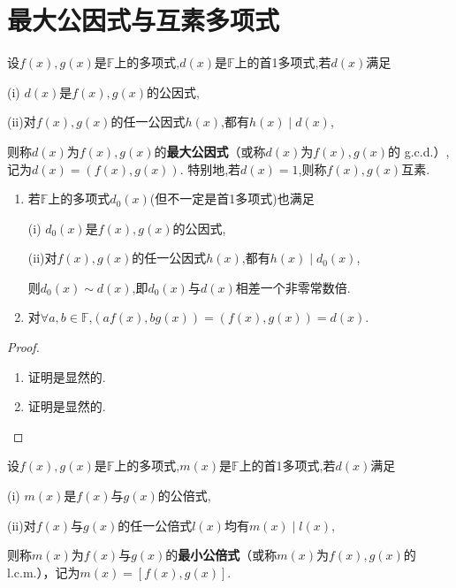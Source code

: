 \documentclass[../../main.tex]{subfiles}%
\begin{document}
\section{最大公因式与互素多项式}

\begin{definition}[最大公因式和互素]\label{definition:最大公因式和互素}
设\(f(x),g(x)\)是\(\mathbb{F}\)上的多项式,$d(x)$是\(\mathbb{F}\)上的首1多项式,若\(d(x)\)满足

(i)$\,\,d(x)$是\(f(x),g(x)\)的公因式,

(ii)对\(f(x),g(x)\)的任一公因式\(h(x)\),都有\(h(x)\mid d(x)\),

则称\(d(x)\)为\(f(x),g(x)\)的\textbf{最大公因式}（或称\(d(x)\)为\(f(x),g(x)\)的 g.c.d.）,记为\(d(x)=(f(x),g(x))\).
特别地,若\(d(x)=1\),则称\(f(x),g(x)\)互素.
\end{definition}

\begin{proposition}\label{proposition:最大公因式的小结论}
\begin{enumerate}[(1)]
\item 若$\mathbb{F}$上的多项式$d_0(x)$(但不一定是首1多项式)也满足

(i)$\,\,d_0(x)$是\(f(x),g(x)\)的公因式,

(ii)对\(f(x),g(x)\)的任一公因式\(h(x)\),都有\(h(x)\mid d_0(x)\),

则$d_0(x)\sim d(x)$,即$d_0(x)$与$d(x)$相差一个非零常数倍.

\item 对$\forall a,b\in\mathbb{F}$,$(af(x),bg(x))=(f(x),g(x))=d(x)$.
\end{enumerate}
\end{proposition}
\begin{proof}
\begin{enumerate}[(1)]
\item 证明是显然的.

\item 证明是显然的.
\end{enumerate}
\end{proof}

\begin{definition}[最小公倍式]\label{definition:最小公倍式}
设\(f(x),g(x)\)是\(\mathbb{F}\)上的多项式,$m(x)$是\(\mathbb{F}\)上的首1多项式,若\(d(x)\)满足

(i)\(\,\,m(x)\)是\(f(x)\)与\(g(x)\)的公倍式,

(ii)对\(f(x)\)与\(g(x)\)的任一公倍式\(l(x)\)均有\(m(x)\mid l(x)\),

则称\(m(x)\)为\(f(x)\)与\(g(x)\)的\textbf{最小公倍式}（或称\(m(x)\)为\(f(x),g(x)\)的 l.c.m.），记为\(m(x)=[f(x),g(x)]\).
\end{definition}
\end{document}
